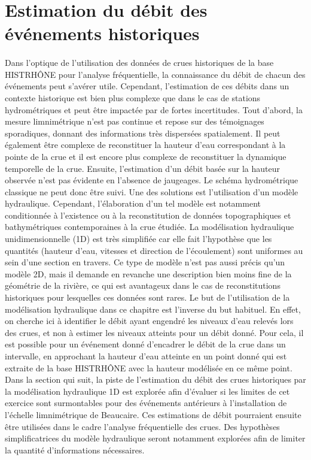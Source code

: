 \FloatBarrier

\section{Estimation du débit des événements historiques}
\label{sec:hydraul}
	\paragraph{} Dans l'optique de l'utilisation des données de crues historiques de la base HISTRHÔNE pour l'analyse fréquentielle, la connaissance du débit de chacun des événements peut s'avérer utile. Cependant, l'estimation de ces débits dans un contexte historique est bien plus complexe que dans le cas de stations hydrométriques et peut être impactée par de fortes incertitudes. Tout d'abord, la mesure limnimétrique n'est pas continue et repose sur des témoignages sporadiques, donnant des informations très dispersées spatialement. Il peut également être complexe de reconstituer la hauteur d'eau correspondant à la pointe de la crue et il est encore plus complexe de reconstituer la dynamique temporelle de la crue. Ensuite, l'estimation d'un débit basée sur la hauteur observée n'est pas évidente en l'absence de jaugeages. Le schéma hydrométrique classique ne peut donc être suivi. Une des solutions est l'utilisation d'un modèle hydraulique. Cependant, l'élaboration d'un tel modèle est notamment conditionnée à l'existence ou à la reconstitution de données topographiques et bathymétriques contemporaines à la crue étudiée. La modélisation hydraulique unidimensionnelle (1D) est très simplifiée car elle fait l'hypothèse que les quantités (hauteur d'eau, vitesses et direction de l'écoulement) sont uniformes au sein d'une section en travers. Ce type de modèle n'est pas aussi précis qu'un modèle 2D, mais il demande en revanche une description bien moins fine de la géométrie de la rivière, ce qui est avantageux dans le cas de reconstitutions historiques pour lesquelles ces données sont rares. Le but de l'utilisation de la modélisation hydraulique dans ce chapitre est l'inverse du but habituel. En effet, on cherche ici à identifier le débit ayant engendré les niveaux d'eau relevés lors des crues, et non à estimer les niveaux atteints pour un débit donné. Pour cela, il est possible pour un événement donné d'encadrer le débit de la crue dans un intervalle, en approchant la hauteur d'eau atteinte en un point donné qui est extraite de la base HISTRHÔNE avec la hauteur modélisée en ce même point. Dans la section qui suit, la piste de l'estimation du débit des crues historiques par la modélisation hydraulique 1D est explorée afin d'évaluer si les limites de cet exercice sont surmontables pour des événements antérieurs à l'installation de l'échelle limnimétrique de Beaucaire. Ces estimations de débit pourraient ensuite être utilisées dans le cadre l'analyse fréquentielle des crues. Des hypothèses simplificatrices du modèle hydraulique seront notamment explorées afin de limiter la quantité d'informations nécessaires.


